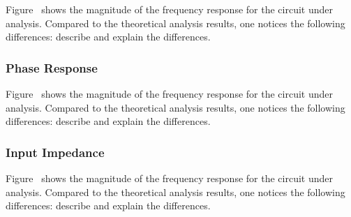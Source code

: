 Figure~%
shows the magnitude of the frequency response for the circuit under analysis. Compared to the theoretical analysis results, one notices the following differences: describe and explain the differences.



\subsubsection{Phase Response}

Figure~%
shows the magnitude of the frequency response for the circuit under analysis. Compared to the theoretical analysis results, one notices the following differences: describe and explain the differences.


\subsubsection{Input Impedance}

Figure~
shows the magnitude of the frequency response for the circuit under analysis. Compared to the theoretical analysis results, one notices the following differences: describe and explain the differences.




